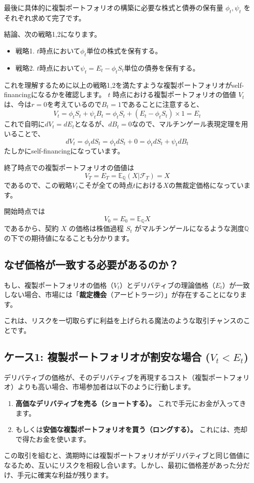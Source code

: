 \documentclass[uplatex,a4j,12pt,dvipdfmx]{jsarticle}
\begin{document}
最後に具体的に複製ポートフォリオの構築に必要な株式と債券の保有量 $\phi_{t} , \psi_{t}$ をそれぞれ求めて完了です。

結論、次の戦略1,2になります。
\begin{itemize}
	\item 戦略1. $t$時点において$\phi_{t}$単位の株式を保有する。
	\item 戦略2. $t$時点において$\psi_{t} = E_{t} - \phi_{t} S_{t}$単位の債券を保有する。
\end{itemize}

これを理解するために以上の戦略1,2を満たすような複製ポートフォリオがself-financingになるかを確認します。
$t$ 時点における複製ポートフォリオの価値 $V_{t}$ は、今は$r=0$を考えているので$B_{t} = 1$であることに注意すると、
$$V_{t} = \phi_{t} S_{t} + \psi_{t} B_{t} = \phi_{t} S_{t} + (E_{t} - \phi_{t} S_{t}) \times 1 = E_{t}$$
これで自明に$dV_{t} = dE_{t}$となるが、$dB_{t} = 0$なので、マルチンゲール表現定理を用いることで、
$$dV_{t} = \phi_{t} dS_{t} = \phi_{t} dS_{t} + 0 = \phi_{t} dS_{t} + \psi_{t} dB_{t}$$
たしかにself-financingになっています。

終了時点での複製ポートフォリオの価値は
$$V_{T} = E_{T} = \mathbb{E}_{\mathbb{Q}}(X|\mathcal{F}_{T}) = X$$
であるので、この戦略$V_{t}$こそが全ての時点$t$における$X$の無裁定価格になっています。

開始時点では
$$V_{0} = E_{0} = \mathbb{E}_{\mathbb{Q}}X$$
であるから、契約 $X$ の価格は株価過程 $S_{t}$ がマルチンゲールになるような測度$\mathbb{Q}$の下での期待値になることも分かります。

\subsection{なぜ価格が一致する必要があるのか？}
もし、複製ポートフォリオの価格（$V_t$）とデリバティブの理論価格（$E_t$）が一致しない場合、市場には「\textbf{裁定機会}（アービトラージ）」が存在することになります。

これは、リスクを一切取らずに利益を上げられる魔法のような取引チャンスのことです。

\subsection{ケース1: 複製ポートフォリオが割安な場合 ($V_t < E_t$)}
デリバティブの価格が、そのデリバティブを再現するコスト（複製ポートフォリオ）よりも高い場合、市場参加者は以下のように行動します。
\begin{enumerate}
	\item \textbf{高価なデリバティブを売る（ショートする）。} これで手元にお金が入ってきます。
	\item もしくは\textbf{安価な複製ポートフォリオを買う（ロングする）。} これには、売却で得たお金を使います。
\end{enumerate}
この取引を組むと、満期時には複製ポートフォリオがデリバティブと同じ価値になるため、互いにリスクを相殺し合います。しかし、最初に価格差があった分だけ、手元に確実な利益が残ります。
\end{document}
